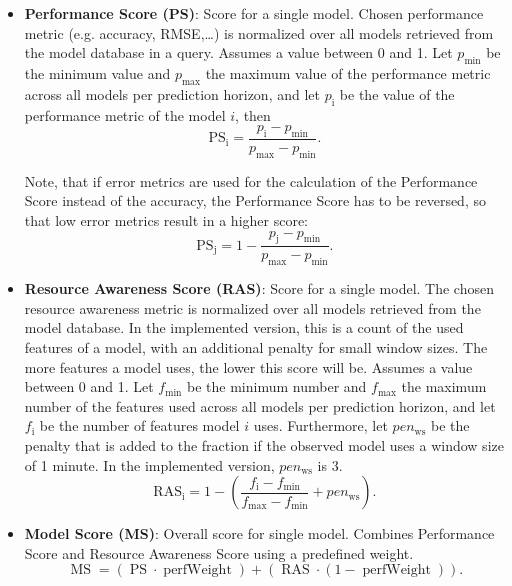 \begin{itemize}
	\item \textbf{Performance Score (PS)}: Score for a single model. Chosen performance metric (e.g. accuracy, RMSE,…) is normalized over all models retrieved from the model database in a query. Assumes a value between 0 and 1. Let $p_\text{min}$ be the minimum value and $p_\text{max}$ the maximum value of the performance metric across all models per prediction horizon, and let $p_\text{i}$ be the value of the performance metric of the model $i$, then
	\begin{equation}
    \operatorname{PS_i} = \frac{p_\text{i} - p_{\text{min}}}{p_{\text{max}} - p_{\text{min}}}.
    \label{ps}
    \end{equation}

  Note, that if error metrics are used for the calculation of the Performance Score instead of the accuracy, the Performance Score has to be reversed, so that low error metrics result in a higher score:
  \begin{equation}
    \operatorname{PS_j} = 1- \frac{p_\text{j} - p_{\text{min}}}{p_{\text{max}} - p_{\text{min}}}.
    \label{psrev}
    \end{equation}

\item \textbf{Resource Awareness Score (RAS)}: Score for a single model. The chosen resource awareness metric is normalized over all models retrieved from the model database. In the implemented version, this is a count of the used features of a model, with an additional penalty for small window sizes. The more features a model uses, the lower this score will be. Assumes a value between 0 and 1. Let $f_\text{min}$ be the minimum number and $f_\text{max}$ the maximum number of the features used across all models per prediction horizon, and let $f_\text{i}$ be the number of features model $i$ uses. Furthermore, let $pen_\text{ws}$ be the penalty that is added to the fraction if the observed model uses a window size of 1 minute. In the implemented version, $pen_\text{ws}$ is $3$.
\begin{equation}
  \operatorname{RAS_i} = 1- (\frac{f_\text{i} - f_{\text{min}}}{f_{\text{max}} - f_{\text{min}}} + pen_\text{ws}).
  \label{ras}
  \end{equation}

\item \textbf{Model Score (MS)}: Overall score for single model. Combines Performance Score and Resource Awareness Score using a predefined weight. 
\begin{equation}
 \operatorname{MS} = (\operatorname{PS} \cdot \operatorname{perfWeight}) + (\operatorname{RAS} \cdot (1- \operatorname{perfWeight})).
  \label{ms}
  \end{equation}


\end{itemize}
